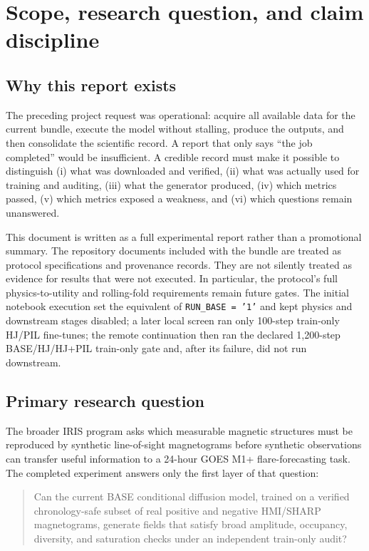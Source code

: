 \documentclass[11pt,oneside]{report}
\begin{document}
\tableofcontents
\listoffigures
\listoftables

\chapter{Scope, research question, and claim discipline}

\section{Why this report exists}

The preceding project request was operational: acquire all available data for the current bundle, execute the model without stalling, produce the outputs, and then consolidate the scientific record. A report that only says “the job completed” would be insufficient. A credible record must make it possible to distinguish (i) what was downloaded and verified, (ii) what was actually used for training and auditing, (iii) what the generator produced, (iv) which metrics passed, (v) which metrics exposed a weakness, and (vi) which questions remain unanswered.

This document is written as a full experimental report rather than a promotional summary. The repository documents included with the bundle are treated as protocol specifications and provenance records. They are not silently treated as evidence for results that were not executed. In particular, the protocol’s full physics-to-utility and rolling-fold requirements remain future gates. The initial notebook execution set the equivalent of \texttt{RUN\_BASE = '1'} and kept physics and downstream stages disabled; a later local screen ran only 100-step train-only HJ/PIL fine-tunes; the remote continuation then ran the declared 1,200-step BASE/HJ/HJ+PIL train-only gate and, after its failure, did not run downstream.

\section{Primary research question}

The broader IRIS program asks which measurable magnetic structures must be reproduced by synthetic line-of-sight magnetograms before synthetic observations can transfer useful information to a 24-hour GOES M1+ flare-forecasting task. The completed experiment answers only the first layer of that question:

\begin{quote}
Can the current BASE conditional diffusion model, trained on a verified chronology-safe subset of real positive and negative HMI/SHARP magnetograms, generate fields that satisfy broad amplitude, occupancy, diversity, and saturation checks under an independent train-only audit?
\end{quote}
\end{document}
